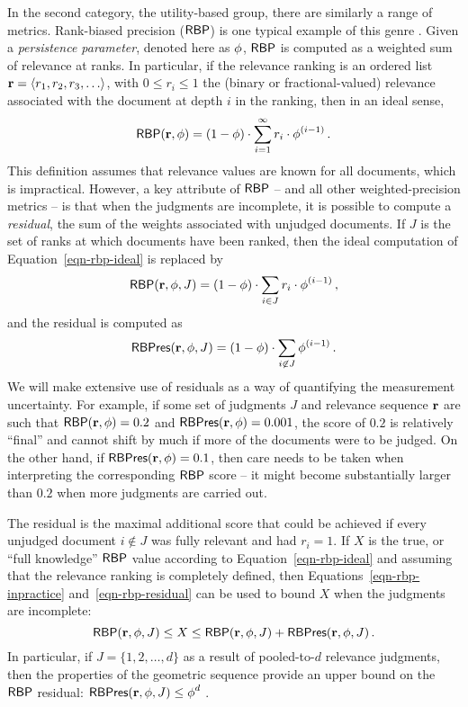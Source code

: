In the second category, the utility-based group, there are similarly
a range of metrics.
Rank-biased precision (${\mbox{\sf{RBP}}}$) is one typical example of this genre
{\citep{mz08acmtois}}.
Given a {\emph{persistence parameter}}, denoted here as $\mbox{$\phi$}$,
${\mbox{\sf{RBP}}}$ is computed as a weighted sum of relevance at ranks.
In particular, if the relevance ranking is an ordered list
$\mbox{\bf{r}}=\langle r_1, r_2, r_3,\ldots\rangle$, with $0\le r_i\le 1$ the
(binary or fractional-valued) relevance associated with the document
at depth $i$ in the ranking, then in an ideal sense,
\begin{equation}
{\mbox{\sf{RBP}}}(\mbox{\bf{r}}, \mbox{$\phi$})
	= (1-\mbox{$\phi$})\cdot\sum_{i=1}^{\infty} r_i \cdot \mbox{$\phi$}^{(i-1)} \,.
	\label{eqn-rbp-ideal}
\end{equation}
This definition assumes that relevance values are known for all
documents, which is impractical.
However, a key attribute of ${\mbox{\sf{RBP}}}$ -- and all other
weighted-precision metrics -- is that when the judgments are
incomplete, it is possible to compute a {\emph{residual}}, the sum of
the weights associated with unjudged documents.
If $J$ is the set of ranks at which documents have been ranked, then
the ideal computation of Equation~\ref{eqn-rbp-ideal} is replaced by
\begin{equation}
{\mbox{\sf{RBP}}}(\mbox{\bf{r}}, \mbox{$\phi$}, J)
	= (1-\mbox{$\phi$})\cdot\sum_{i\in J} r_i \cdot \mbox{$\phi$}^{(i-1)} \,,
	\label{eqn-rbp-inpractice}
\end{equation}
and the residual is computed as
\begin{equation}
{\mbox{\sf{RBPres}}}(\mbox{\bf{r}}, \mbox{$\phi$}, J)
	= (1-\mbox{$\phi$})\cdot\sum_{i\not\in J} \mbox{$\phi$}^{(i-1)} \,.
	\label{eqn-rbp-residual}
\end{equation}
We will make extensive use of residuals as a way of quantifying the
measurement uncertainty.
For example, if some set of judgments $J$ and relevance sequence
$\mbox{\bf{r}}$ are such that ${\mbox{\sf{RBP}}}(\mbox{\bf{r}},\mbox{$\phi$})=0.2$ and
${\mbox{\sf{RBPres}}}(\mbox{\bf{r}},\mbox{$\phi$})=0.001$, the score of $0.2$ is relatively ``final'' and
cannot shift by much if more of the documents were to be judged.
On the other hand, if ${\mbox{\sf{RBPres}}}(\mbox{\bf{r}},\mbox{$\phi$})=0.1$, then care needs to
be taken when interpreting the corresponding ${\mbox{\sf{RBP}}}$ score -- it might
become substantially larger than $0.2$ when more judgments are
carried out.

The residual is the maximal additional score that could be achieved
if every unjudged document $i\not\in J$ was fully relevant and had
$r_i=1$.
If $X$ is the true, or ``full knowledge'' ${\mbox{\sf{RBP}}}$ value according to
Equation~\ref{eqn-rbp-ideal} and assuming that the relevance ranking
is completely defined, then Equations~\ref{eqn-rbp-inpractice}
and~\ref{eqn-rbp-residual} can be used to bound $X$ when the
judgments are incomplete:
\[
	{\mbox{\sf{RBP}}}(\mbox{\bf{r}},\mbox{$\phi$}, J)
	\le
	X
	\le
	{\mbox{\sf{RBP}}}(\mbox{\bf{r}},\mbox{$\phi$}, J) + {\mbox{\sf{RBPres}}}(\mbox{\bf{r}},\mbox{$\phi$}, J) \, .
\]
In particular, if $J=\{1,2,\ldots,d\}$ as a result of pooled-to-$d$
relevance judgments, then the properties of the geometric sequence
provide an upper bound on the ${\mbox{\sf{RBP}}}$ residual:
${\mbox{\sf{RBPres}}}(\mbox{\bf{r}},\mbox{$\phi$},J)\le\mbox{$\phi$}^d$ {\citep{mz08acmtois}}.

